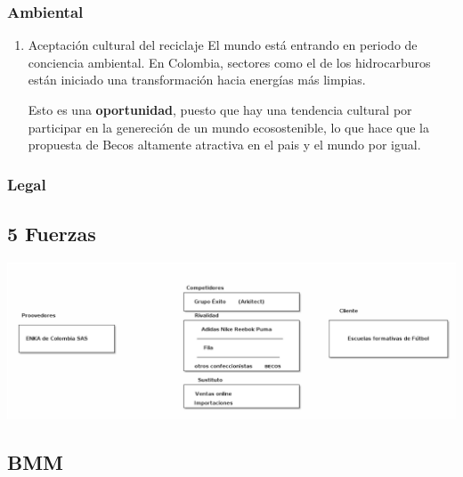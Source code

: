 \documentclass[11pt]{article}
\begin{document}
\subsubsection{Ambiental}
\label{sec:org8b85af3}
\begin{enumerate}
\item Aceptación cultural del reciclaje
\label{sec:org60c89de}
El mundo está entrando en periodo de conciencia ambiental. En
Colombia, sectores como el de los hidrocarburos están iniciado una
transformación hacia energías más limpias.

Esto es una \textbf{oportunidad}, puesto que hay una tendencia cultural
por participar en la genereción de un mundo ecosostenible, lo
que hace que la propuesta de Becos altamente atractiva en el pais
y el mundo por igual.
\end{enumerate}
\subsubsection{Legal}
\label{sec:orgde209b9}
\subsection{5 Fuerzas}
\label{sec:orgce6de29}

\begin{center}
\includegraphics[width=.9\linewidth]{./assets/build/5_fuerzas.png}
\end{center}

\subsection{BMM}
\label{sec:org9b63dec}
\end{document}
